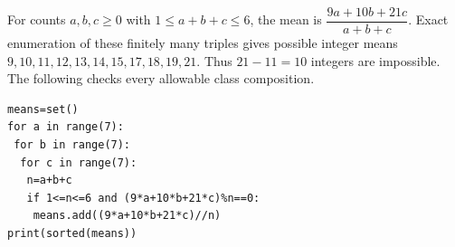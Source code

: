 For counts $a,b,c\ge0$ with $1\le a+b+c\le6$, the mean is $\dfrac{9a+10b+21c}{a+b+c}$. Exact enumeration of these finitely many triples gives possible integer means $9,10,11,12,13,14,15,17,18,19,21$. Thus $\boxed{21-11=10}$ integers are impossible. The following checks every allowable class composition.\begin{verbatim}
means=set()
for a in range(7):
 for b in range(7):
  for c in range(7):
   n=a+b+c
   if 1<=n<=6 and (9*a+10*b+21*c)%n==0:
    means.add((9*a+10*b+21*c)//n)
print(sorted(means))
\end{verbatim}
